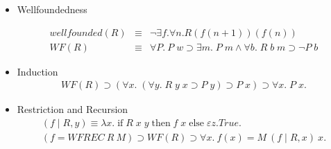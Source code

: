 \begin{slide}
\medskip
\begin{itemize}
\item Wellfoundedness

\begin{eqnarray*}
wellfounded(R) & \equiv & \neg\exists f. \forall n. R (f(n+1)) (f(n)) \\
          WF(R) & \equiv & \forall P.\ P \;w \supset \exists m.\;
   P\;m \land \forall b.\; R \;b \; m \supset \neg P\;b
\end{eqnarray*}




\item Induction
\begin{eqnarray*}
 WF(R)  \supset (\forall x.\; (\forall y.\;R\; y\; x \supset  P\; y) \supset P
\;x) \supset \forall x.\; P \;x.
\end{eqnarray*}


\item Restriction and Recursion
\begin{eqnarray*}
 (f\!\mid\! R,y) \equiv \lambda x.\; \mbox{if}\; R\;x \;y
\;\mbox{then}\; f\; x \; \mbox{else}\; \varepsilon z.True. \\
(f = WFREC\ R\ M) \supset WF(R) \supset \forall x.\ f(x) = M\ (f\!\mid\!
R,x)\ x.
\end{eqnarray*}

\end{itemize}

%

\end{slide}

%


